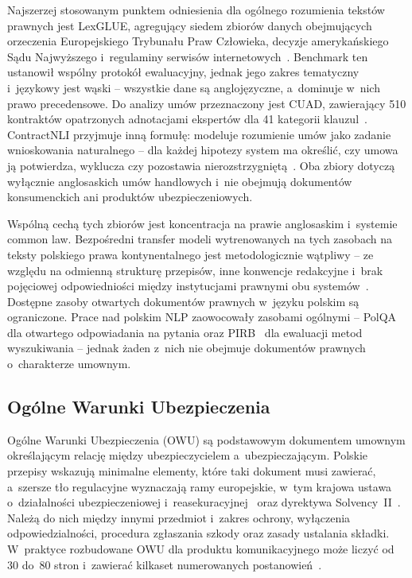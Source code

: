 Najszerzej stosowanym punktem odniesienia dla ogólnego rozumienia tekstów
prawnych jest LexGLUE, agregujący siedem zbiorów danych obejmujących orzeczenia
Europejskiego Trybunału Praw Człowieka, decyzje amerykańskiego Sądu Najwyższego
i~regulaminy serwisów internetowych~\cite{chalkidis2022lexglue}. Benchmark ten
ustanowił wspólny protokół ewaluacyjny, jednak jego zakres tematyczny
i~językowy jest wąski -- wszystkie dane są anglojęzyczne, a~dominuje w~nich
prawo precedensowe. Do analizy umów przeznaczony jest CUAD, zawierający 510
kontraktów opatrzonych adnotacjami ekspertów dla 41 kategorii
klauzul~\cite{hendrycks2021cuad}. ContractNLI przyjmuje inną formułę: modeluje
rozumienie umów jako zadanie wnioskowania naturalnego -- dla każdej hipotezy
system ma określić, czy umowa ją potwierdza, wyklucza czy pozostawia
nierozstrzygniętą~\cite{koreeda2021contractnli}. Oba zbiory dotyczą wyłącznie
anglosaskich umów handlowych i~nie obejmują dokumentów konsumenckich ani
produktów ubezpieczeniowych.

Wspólną cechą tych zbiorów jest koncentracja na prawie anglosaskim i~systemie
common law. Bezpośredni transfer modeli wytrenowanych na tych zasobach na
teksty polskiego prawa kontynentalnego jest metodologicznie wątpliwy -- ze
względu na odmienną strukturę przepisów, inne konwencje redakcyjne i~brak
pojęciowej odpowiedniości między instytucjami prawnymi obu
systemów~\cite{chalkidis2020legal}. Dostępne zasoby otwartych dokumentów
prawnych w~języku polskim są ograniczone. Prace nad polskim NLP zaowocowały
zasobami ogólnymi -- PolQA~\cite{rybak2024polqa} dla otwartego odpowiadania na
pytania oraz PIRB~\cite{dadas2024pirb} dla ewaluacji metod wyszukiwania --
jednak żaden z~nich nie obejmuje dokumentów prawnych o~charakterze umownym.

\subsection{Ogólne Warunki Ubezpieczenia}\label{subsec:owu}

Ogólne Warunki Ubezpieczenia (OWU) są podstawowym dokumentem umownym
określającym relację między ubezpieczycielem a~ubezpieczającym. Polskie
przepisy wskazują minimalne elementy, które taki dokument musi zawierać,
a~szersze tło regulacyjne wyznaczają ramy europejskie, w~tym krajowa ustawa
o~działalności ubezpieczeniowej
i~reasekuracyjnej~\cite{ustawa2015ubezpieczenia} oraz dyrektywa
Solvency~II~\cite{solvency2009}. Należą do nich między innymi przedmiot
i~zakres ochrony, wyłączenia odpowiedzialności, procedura zgłaszania szkody
oraz zasady ustalania składki. W~praktyce rozbudowane OWU dla produktu
komunikacyjnego może liczyć od 30 do~80 stron i~zawierać kilkaset numerowanych
postanowień~\cite{piu2023}.

